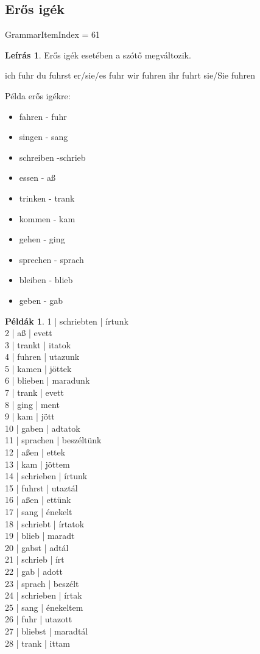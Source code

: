 \documentclass{article}
\theoremstyle{definition}
\newtheorem*{exmp}{Példák}
\newtheorem*{desc}{Leírás}
\begin{document}
\subsection{Erős igék}

GrammarItemIndex = 61

\begin{desc}
Erős igék esetében a szótő megváltozik.

ich fuhr
du fuhrst
er/sie/es fuhr
wir fuhren
ihr fuhrt
sie/Sie fuhren

Példa erős igékre:
\begin{itemize}
\item fahren - fuhr
\item singen - sang
\item schreiben -schrieb
\item essen - aß
\item trinken - trank
\item kommen - kam
\item gehen - ging
\item sprechen - sprach
\item bleiben - blieb
\item geben - gab
\end{itemize}
\end{desc}

\begin{exmp}
1 | schriebten | írtunk\\
2 | aß | evett\\
3 | trankt | itatok\\
4 | fuhren | utazunk\\
5 | kamen | jöttek\\
6 | blieben | maradunk\\
7 | trank | evett\\
8 | ging | ment\\
9 | kam | jött\\
10 | gaben | adtatok\\
11 | sprachen | beszéltünk\\
12 | aßen | ettek\\
13 | kam | jöttem\\
14 | schrieben | írtunk\\
15 | fuhrst | utaztál\\
16 | aßen | ettünk\\
17 | sang | énekelt\\
18 | schriebt | írtatok\\
19 | blieb | maradt\\
20 | gabst | adtál\\
21 | schrieb | írt\\
22 | gab | adott\\
23 | sprach | beszélt\\
24 | schrieben | írtak\\
25 | sang | énekeltem\\
26 | fuhr | utazott\\
27 | bliebst | maradtál\\
28 | trank | ittam\\
\end{exmp}
\end{document}

